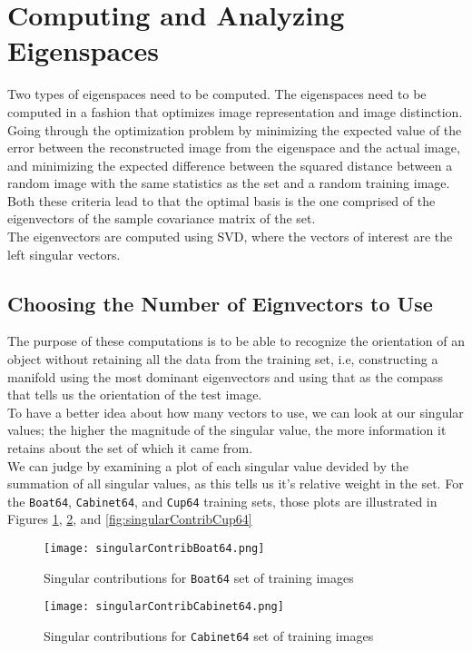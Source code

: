 \documentclass[10pt,twocolumn,letterpaper]{article}
\begin{document}
\section{Computing and Analyzing Eigenspaces}
Two types of eigenspaces need to be computed. The eigenspaces need to be computed in a fashion that optimizes image representation and image distinction. Going through the optimization problem by minimizing the expected value of the error between the reconstructed image from the eigenspace and the actual image, and minimizing the expected difference between the squared distance between a random image with the same statistics as the set and a random training image. Both these criteria lead to that the optimal basis is the one comprised of the eigenvectors of the sample covariance matrix of the set.\\
The eigenvectors are computed using SVD, where the vectors of interest are the left singular vectors.
\subsection{Choosing the Number of Eignvectors to Use}
The purpose of these computations is to be able to recognize the orientation of an object without retaining all the data from the training set, i.e, constructing a manifold using the most dominant eigenvectors and using that as the compass that tells us the orientation of the test image.\\
To have a better idea about how many vectors to use, we can look at our singular values; the higher the magnitude of the singular value, the more information it retains about the set of which it came from.\\
We can judge by examining a plot of each singular value devided by the summation of all singular values, as this tells us it's relative weight in the set. For the \texttt{Boat64}, \texttt{Cabinet64}, and \texttt{Cup64} training sets, those plots are illustrated in Figures \ref{fig:singularContribBoat64}, \ref{fig:singularContribCabinet64}, and \ref{fig:singularContribCup64}
\begin{figure}
\texttt{[image: singularContribBoat64.png]}
\caption{Singular contributions for \texttt{Boat64} set of training images}
\label{fig:singularContribBoat64}
\end{figure}

\begin{figure}
\texttt{[image: singularContribCabinet64.png]}
\caption{Singular contributions for \texttt{Cabinet64} set of training images}
\label{fig:singularContribCabinet64}
\end{figure}
\end{document}
